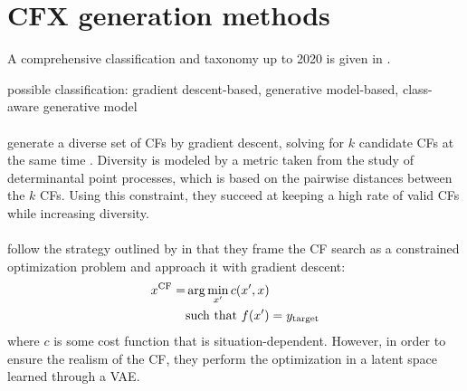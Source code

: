 \documentclass[../main.tex]{subfiles}
\begin{document}
\section{CFX generation methods}

A comprehensive classification and taxonomy up to 2020 is given in \cite{vermaCounterfactual2020}.




possible classification: gradient descent-based, generative model-based, class-aware generative model \citenote{}

\paragraph{}

\citeauthor{mothilalExplaining2020} generate a diverse set of CFs by gradient descent, solving for $k$ candidate CFs at the same time \cite{mothilalExplaining2020}.
Diversity is modeled by a metric taken from the study of determinantal point processes, which is based on the pairwise distances between the $k$ CFs.
Using this constraint, they succeed at keeping a high rate of valid CFs while increasing diversity.

\paragraph{\revise{}}
\label{par:revise}

\citeauthor{joshiRealistic2019} follow the strategy outlined by \citeauthor{wachterCounterfactual2017} in that they frame the CF search as a constrained optimization problem and approach it with gradient descent:
\begin{align*}
	x^\text{CF} = & \arg\min_{x'} c(x', x)              \\
	         & \text{such that } f(x') = y_{\mathrm{target}}
\end{align*}
where $c$ is some cost function that is situation-dependent.
However, in order to ensure the realism of the CF, they perform the optimization in a latent space learned through a VAE.
\end{document}
